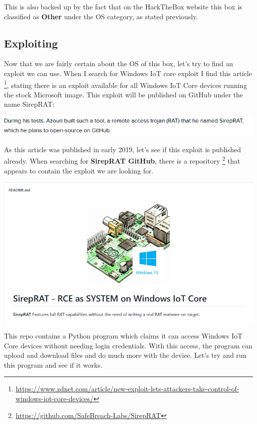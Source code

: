 \documentclass[../main.tex]{subfiles}
\begin{document}
This is also backed up by the fact that on the HackTheBox website this box is classified as \textbf{Other} under the OS category, as stated previously.

\newpage
\subsection{Exploiting}

Now that we are fairly certain about the OS of this box, let's try to find an exploit we can use. When I search for Windows IoT core exploit I find this article \footnote{\url{https://www.zdnet.com/article/new-exploit-lets-attackers-take-control-of-windows-iot-core-devices/}}, stating there is an exploit available for all Windows IoT Core devices running the stock Microsoft image. This exploit will be published on GitHub under the name SirepRAT:

\includegraphics[width=\linewidth]{images/Wannes/omni_sireprat.png}

As this article was published in early 2019, let's see if this exploit is published already. When searching for \textbf{SirepRAT GitHub}, there is a repository \footnote{\url{https://github.com/SafeBreach-Labs/SirepRAT}} that appears to contain the exploit we are looking for.

\includegraphics[width=\linewidth]{images/Wannes/omni_sireprat_github.png}

This repo contains a Python program which claims it can access Windows IoT Core devices without needing login credentials. With this access, the program can upload and download files and do much more with the device. Let's try and run this program and see if it works.
\end{document}
